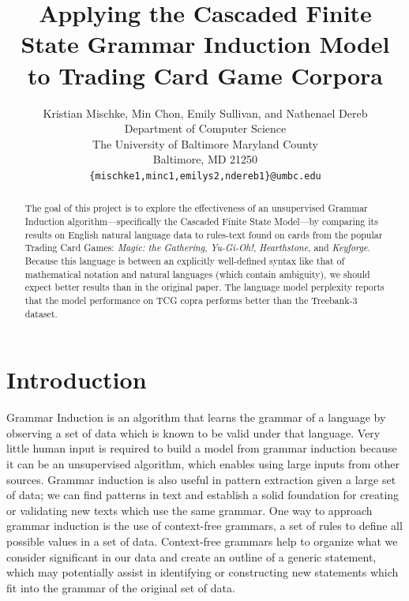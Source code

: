 \documentclass[11pt,a4paper]{article}
\title{Applying the Cascaded Finite State Grammar Induction Model to Trading Card Game Corpora}
\author{Kristian Mischke, Min Chon, Emily Sullivan, and Nathenael Dereb \\
  Department of Computer Science \\
  The University of Baltimore Maryland County \\
  Baltimore, MD 21250 \\
  \texttt{\{mischke1,minc1,emilys2,ndereb1\}@umbc.edu} \\}
\date{}
\begin{document}
\maketitle
\begin{abstract}
The goal of this project is to explore the effectiveness of an unsupervised Grammar Induction algorithm—specifically the Cascaded Finite State Model—by comparing its results on English natural language data to rules-text found on cards from the popular Trading Card Games: \emph{Magic: the Gathering}, \emph{Yu-Gi-Oh!}, \emph{Hearthstone}, and \emph{Keyforge}. Because this language is between an explicitly well-defined syntax like that of mathematical notation and natural languages (which contain ambiguity), we should expect better results than in the original paper. The language model perplexity reports that the model performance on TCG copra performs better than the Treebank-3 dataset.

\end{abstract}

\section{Introduction}
Grammar Induction is an algorithm that learns the grammar of a language by observing a set of data which is known to be valid under that language. Very little human input is required to build a model from grammar induction because it can be an unsupervised algorithm, which enables using large inputs from other sources. Grammar induction is also useful in pattern extraction given a large set of data; we can find patterns in text and establish a solid foundation for creating or validating new texts which use the same grammar. One way to approach grammar induction is the use of context-free grammars, a set of rules to define all possible values in a set of data. Context-free grammars help to organize what we consider significant in our data and create an outline of a generic statement, which may potentially assist in identifying or constructing new statements which fit into the grammar of the original set of data.
\end{document}
